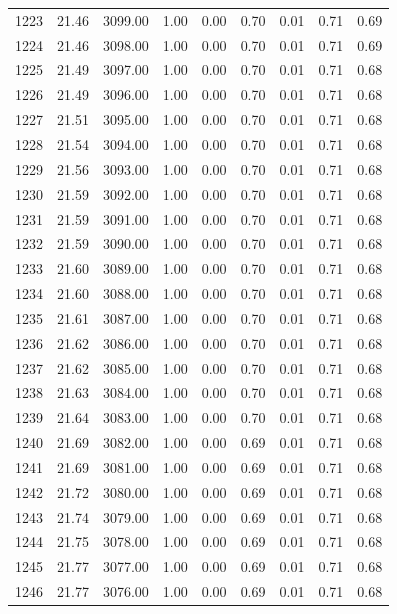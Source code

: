 \documentclass{article}\usepackage[]{graphicx}\usepackage[]{color}
\begin{document}
\begin{longtable}{rrrrrrrrr}
  1223 & 21.46 & 3099.00 & 1.00 & 0.00 & 0.70 & 0.01 & 0.71 & 0.69 \\ 
  1224 & 21.46 & 3098.00 & 1.00 & 0.00 & 0.70 & 0.01 & 0.71 & 0.69 \\ 
  1225 & 21.49 & 3097.00 & 1.00 & 0.00 & 0.70 & 0.01 & 0.71 & 0.68 \\ 
  1226 & 21.49 & 3096.00 & 1.00 & 0.00 & 0.70 & 0.01 & 0.71 & 0.68 \\ 
  1227 & 21.51 & 3095.00 & 1.00 & 0.00 & 0.70 & 0.01 & 0.71 & 0.68 \\ 
  1228 & 21.54 & 3094.00 & 1.00 & 0.00 & 0.70 & 0.01 & 0.71 & 0.68 \\ 
  1229 & 21.56 & 3093.00 & 1.00 & 0.00 & 0.70 & 0.01 & 0.71 & 0.68 \\ 
  1230 & 21.59 & 3092.00 & 1.00 & 0.00 & 0.70 & 0.01 & 0.71 & 0.68 \\ 
  1231 & 21.59 & 3091.00 & 1.00 & 0.00 & 0.70 & 0.01 & 0.71 & 0.68 \\ 
  1232 & 21.59 & 3090.00 & 1.00 & 0.00 & 0.70 & 0.01 & 0.71 & 0.68 \\ 
  1233 & 21.60 & 3089.00 & 1.00 & 0.00 & 0.70 & 0.01 & 0.71 & 0.68 \\ 
  1234 & 21.60 & 3088.00 & 1.00 & 0.00 & 0.70 & 0.01 & 0.71 & 0.68 \\ 
  1235 & 21.61 & 3087.00 & 1.00 & 0.00 & 0.70 & 0.01 & 0.71 & 0.68 \\ 
  1236 & 21.62 & 3086.00 & 1.00 & 0.00 & 0.70 & 0.01 & 0.71 & 0.68 \\ 
  1237 & 21.62 & 3085.00 & 1.00 & 0.00 & 0.70 & 0.01 & 0.71 & 0.68 \\ 
  1238 & 21.63 & 3084.00 & 1.00 & 0.00 & 0.70 & 0.01 & 0.71 & 0.68 \\ 
  1239 & 21.64 & 3083.00 & 1.00 & 0.00 & 0.70 & 0.01 & 0.71 & 0.68 \\ 
  1240 & 21.69 & 3082.00 & 1.00 & 0.00 & 0.69 & 0.01 & 0.71 & 0.68 \\ 
  1241 & 21.69 & 3081.00 & 1.00 & 0.00 & 0.69 & 0.01 & 0.71 & 0.68 \\ 
  1242 & 21.72 & 3080.00 & 1.00 & 0.00 & 0.69 & 0.01 & 0.71 & 0.68 \\ 
  1243 & 21.74 & 3079.00 & 1.00 & 0.00 & 0.69 & 0.01 & 0.71 & 0.68 \\ 
  1244 & 21.75 & 3078.00 & 1.00 & 0.00 & 0.69 & 0.01 & 0.71 & 0.68 \\ 
  1245 & 21.77 & 3077.00 & 1.00 & 0.00 & 0.69 & 0.01 & 0.71 & 0.68 \\ 
  1246 & 21.77 & 3076.00 & 1.00 & 0.00 & 0.69 & 0.01 & 0.71 & 0.68 \\ 

\end{longtable}
\end{document}
